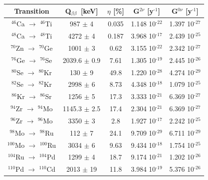 \documentclass[main.tex]{subfiles}
\begin{document}
\begin{table}
\centering
\small
\begin{tabular}{|c|c|c|c|c|}
\hline
Transition & Q$_{\beta\beta}$~[keV] & $\eta$ [\%] & G$^{\text{2}\nu}$ [y$^{\text{-1}}$] & G$^{\text{0}\nu}$ [y$^{\text{-1}}$] \\
\hline
$^{\text{46}}$Ca $\rightarrow$ $^{\text{46}}$Ti & 987      $\pm$ 4   & 0.035  & 1.148 10$^{\text{-22}}$ & 1.397 10$^{\text{-27}}$\\
\hline
$^{\text{48}}$Ca $\rightarrow$ $^{\text{48}}$Ti & 4272     $\pm$ 4   & 0.187  & 3.968 10$^{\text{-17}}$ & 2.439 10$^{\text{-25}}$\\ 
\hline
$^{\text{70}}$Zn $\rightarrow$ $^{\text{70}}$Ge & 1001     $\pm$ 3   & 0.62   & 3.155 10$^{\text{-22}}$ & 2.342 10$^{\text{-27}}$\\ 
\hline
$^{\text{76}}$Ge $\rightarrow$ $^{\text{76}}$Se & 2039.6   $\pm$ 0.9 & 7.61   & 1.305 10$^{\text{-19}}$ & 2.445 10$^{\text{-26}}$\\ 
\hline
$^{\text{80}}$Se $\rightarrow$ $^{\text{80}}$Kr & 130      $\pm$ 9   & 49.8   & 1.220 10$^{\text{-28}}$ & 4.274 10$^{\text{-29}}$\\ 
\hline
$^{\text{82}}$Se $\rightarrow$ $^{\text{82}}$Kr & 2998     $\pm$ 6   & 8.73   & 4.348 10$^{\text{-18}}$ & 1.079 10$^{\text{-25}}$\\ 
\hline
$^{\text{86}}$Kr $\rightarrow$ $^{\text{86}}$Sr & 1256     $\pm$ 5   & 17.3   & 3.333 10$^{\text{-21}}$ & 6.369 10$^{\text{-27}}$\\ 
\hline
$^{\text{94}}$Zr $\rightarrow$ $^{\text{94}}$Mo & 1145.3   $\pm$ 2.5 & 17.4   & 2.304 10$^{\text{-21}}$ & 6.369 10$^{\text{-27}}$\\ 
\hline
$^{\text{96}}$Zr $\rightarrow$ $^{\text{96}}$Mo & 3350     $\pm$ 3   & 2.8    & 1.927 10$^{\text{-17}}$ & 2.242 10$^{\text{-25}}$\\ 
\hline
$^{\text{98}}$Mo $\rightarrow$ $^{\text{98}}$Ru & 112      $\pm$ 7   & 24.1   & 9.709 10$^{\text{-29}}$ & 6.711 10$^{\text{-29}}$\\ 
\hline
$^{\text{100}}$Mo $\rightarrow$ $^{\text{100}}$Ru & 3034   $\pm$ 6   & 9.63   & 9.434 10$^{\text{-18}}$ & 1.754 10$^{\text{-25}}$\\ 
\hline
$^{\text{104}}$Ru $\rightarrow$ $^{\text{104}}$Pd & 1299   $\pm$ 4   & 18.7   & 9.174 10$^{\text{-21}}$ & 1.202 10$^{\text{-26}}$\\ 
\hline
$^{\text{110}}$Pd $\rightarrow$ $^{\text{110}}$Cd & 2013   $\pm$ 19  & 11.8   & 3.984 10$^{\text{-19}}$ & 5.376 10$^{\text{-26}}$\\ 

\end{tabular}
\end{table}
\end{document}
